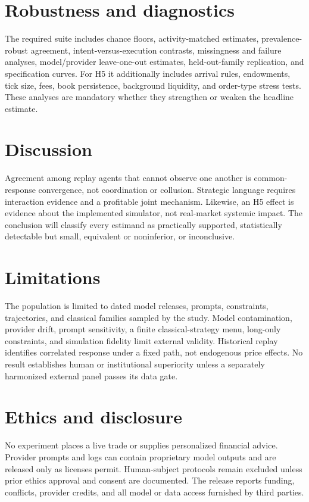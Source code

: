 \documentclass[11pt]{article}
\begin{document}
\section{Robustness and diagnostics}
The required suite includes chance floors, activity-matched estimates,
prevalence-robust agreement, intent-versus-execution contrasts, missingness and
failure analyses, model/provider leave-one-out estimates, held-out-family
replication, and specification curves. For H5 it additionally includes arrival
rules, endowments, tick size, fees, book persistence, background liquidity, and
order-type stress tests. These analyses are mandatory whether they strengthen
or weaken the headline estimate.

\section{Discussion}
Agreement among replay agents that cannot observe one another is common-response
convergence, not coordination or collusion. Strategic language requires
interaction evidence and a profitable joint mechanism. Likewise, an H5 effect
is evidence about the implemented simulator, not real-market systemic impact.
The conclusion will classify every estimand as practically supported,
statistically detectable but small, equivalent or noninferior, or inconclusive.

\section{Limitations}
The population is limited to dated model releases, prompts, constraints,
trajectories, and classical families sampled by the study. Model contamination,
provider drift, prompt sensitivity, a finite classical-strategy menu, long-only
constraints, and simulation fidelity limit external validity. Historical
replay identifies correlated response under a fixed path, not endogenous price
effects. No result establishes human or institutional superiority unless a
separately harmonized external panel passes its data gate.

\section{Ethics and disclosure}
No experiment places a live trade or supplies personalized financial advice.
Provider prompts and logs can contain proprietary model outputs and are released
only as licenses permit. Human-subject protocols remain excluded unless prior
ethics approval and consent are documented. The release reports funding,
conflicts, provider credits, and all model or data access furnished by third
parties.
\end{document}
